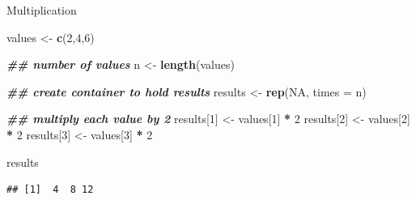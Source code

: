 \documentclass[
  ignorenonframetext,
]{beamer}
\newenvironment{Shaded}{\begin{snugshade}}{\end{snugshade}}
\newcommand{\AttributeTok}[1]{\textcolor[rgb]{0.13,0.29,0.53}{#1}}
\newcommand{\ConstantTok}[1]{\textcolor[rgb]{0.56,0.35,0.01}{#1}}
\newcommand{\DecValTok}[1]{\textcolor[rgb]{0.00,0.00,0.81}{#1}}
\newcommand{\DocumentationTok}[1]{\textcolor[rgb]{0.56,0.35,0.01}{\textbf{\textit{#1}}}}
\newcommand{\FunctionTok}[1]{\textcolor[rgb]{0.13,0.29,0.53}{\textbf{#1}}}
\newcommand{\NormalTok}[1]{#1}
\newcommand{\OtherTok}[1]{\textcolor[rgb]{0.56,0.35,0.01}{#1}}
\newcommand{\SpecialCharTok}[1]{\textcolor[rgb]{0.81,0.36,0.00}{\textbf{#1}}}
\begin{document}
\begin{frame}[fragile,t]{Multiplication}
\label{multiplication-5}
\footnotesize

\begin{Shaded}
\begin{Highlighting}[]
\NormalTok{values }\OtherTok{\textless{}{-}} \FunctionTok{c}\NormalTok{(}\DecValTok{2}\NormalTok{,}\DecValTok{4}\NormalTok{,}\DecValTok{6}\NormalTok{)}

\DocumentationTok{\#\# number of values}
\NormalTok{n }\OtherTok{\textless{}{-}} \FunctionTok{length}\NormalTok{(values)}

\DocumentationTok{\#\# create container to hold results}
\NormalTok{results }\OtherTok{\textless{}{-}} \FunctionTok{rep}\NormalTok{(}\ConstantTok{NA}\NormalTok{, }\AttributeTok{times =}\NormalTok{ n)}

\DocumentationTok{\#\# multiply each value by 2}
\NormalTok{results[}\DecValTok{1}\NormalTok{] }\OtherTok{\textless{}{-}}\NormalTok{ values[}\DecValTok{1}\NormalTok{] }\SpecialCharTok{*} \DecValTok{2}
\NormalTok{results[}\DecValTok{2}\NormalTok{] }\OtherTok{\textless{}{-}}\NormalTok{ values[}\DecValTok{2}\NormalTok{] }\SpecialCharTok{*} \DecValTok{2}
\NormalTok{results[}\DecValTok{3}\NormalTok{] }\OtherTok{\textless{}{-}}\NormalTok{ values[}\DecValTok{3}\NormalTok{] }\SpecialCharTok{*} \DecValTok{2}

\NormalTok{results}
\end{Highlighting}
\end{Shaded}

\begin{verbatim}
## [1]  4  8 12
\end{verbatim}
\end{frame}
\end{document}
